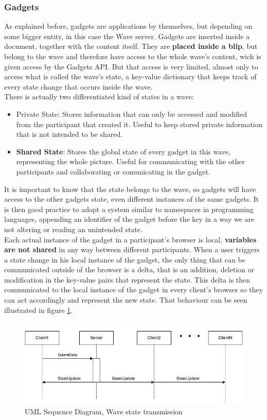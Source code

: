 \subsubsection{Gadgets}
As explained before, gadgets are applications by themselves, but depending on some bigger entity, in this case the Wave server. Gadgets are inserted inside a document, together with the content itself. They are \textbf{placed inside a blip}, but belong to the wave and therefore have access to the whole wave's content, wich is given access by the Gadgets API. But that access is very limited, almost only to access what is called the wave's state, a key-value dictionary that keeps track of every state change that occurs inside the wave.\\[.2cm]
There is actually two differentiated kind of states in a wave:
\begin{itemize}
  \item Private State: Stores information that can only be accessed and modified from the participant that created it. Useful to keep stored private information that is not intended to be shared.
  \item \textbf{Shared State}: Stores the global state of every gadget in this wave, representing the whole picture. Useful for communicating with the other participants and collaborating or comunicating in the gadget.
\end{itemize}
It is important to know that the state belongs to the wave, so gadgets will have access to the other gadgets state, even different instances of the same gadgets. It is then good practice to adopt a system similar to namespaces in programming languages, appending an identifier of the gadget before the key in a way we are not altering or reading an unintended state.\\[.2cm]
Each actual instance of the gadget in a participant's browser is local, \textbf{variables are not shared} in any way between different participants. When a user triggers a state change in his local instance of the gadget, the only thing that can be communicated outside of the browser is a delta, that is an addition, deletion or modification in the key-value pairs that represent the state. This delta is then communicated to the local instance of the gadget in every client's browser so they can act accordingly and represent the new state. That behaviour can be seen illustrated in figure \ref{fig:wave_state}.
\begin{figure}[H]
  \center
    \includegraphics[keepaspectratio, scale=0.6]{Media/Diagrams/Wave/StateSequence.png}
  \caption{UML Sequence Diagram, Wave state transmission}
  \label{fig:wave_state}
\end{figure}
